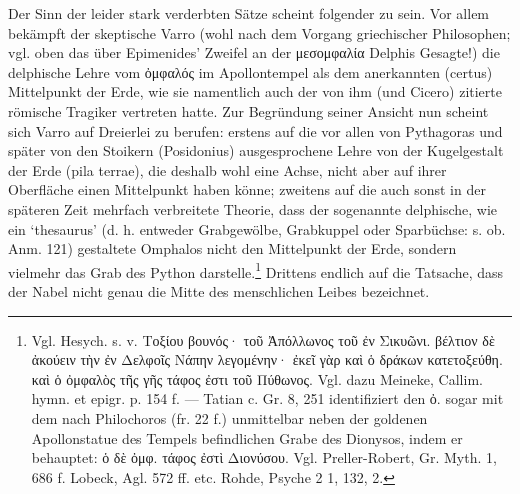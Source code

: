 \documentclass[a4paper, 11pt, oneside]{article}
\begin{document}
Der Sinn der leider stark verderbten Sätze scheint folgender zu sein. Vor allem bekämpft der skeptische Varro (wohl nach dem Vorgang griechischer Philosophen; vgl. oben das über Epimenides' Zweifel an der μεσομφαλία Delphis Gesagte!) die delphische Lehre vom ὀμφαλός im Apollontempel als dem anerkannten (certus) Mittelpunkt der Erde, wie sie namentlich auch der von ihm (und Cicero) zitierte römische Tragiker vertreten hatte. Zur Begründung seiner Ansicht nun scheint sich Varro auf Dreierlei zu berufen: erstens auf die vor allen von Pythagoras und später von den Stoikern (Posidonius) ausgesprochene Lehre von der Kugelgestalt der Erde (pila terrae), die deshalb wohl eine Achse, nicht aber auf ihrer Oberfläche einen Mittelpunkt haben könne; zweitens auf die auch sonst in der späteren Zeit mehrfach verbreitete Theorie, dass der sogenannte delphische, wie ein `thesaurus' (d. h. entweder Grabgewölbe, Grabkuppel oder Sparbüchse: s. ob. Anm. 121) gestaltete Omphalos nicht den Mittelpunkt der Erde, sondern vielmehr das Grab des Python darstelle.\footnote{Vgl. Hesych. s. v. Τοξίου βουνός· τοῦ Ἀπόλλωνος τοῦ ἐν Σικυῶνι. βέλτιον δὲ ἀκούειν τὴν ἐν Δελφοῖς Νάπην λεγομένην· ἐκεῖ γὰρ καὶ ὁ δράκων κατετοξεύθη. καὶ ὁ ὀμφαλὸς τῆς γῆς τάφος ἐστι τοῦ Πύθωνος. Vgl. dazu Meineke, Callim. hymn. et epigr. p. 154 f. --- Tatian c. Gr. 8, 251 identifiziert den ὀ. sogar mit dem nach Philochoros (fr. 22 f.) unmittelbar neben der goldenen Apollonstatue des Tempels befindlichen Grabe des Dionysos, indem er behauptet: ὁ δὲ ὀμφ. τάφος ἐστὶ Διονύσου. Vgl. Preller-Robert, Gr. Myth. 1, 686 f. Lobeck, Agl. 572 ff. etc. Rohde, Psyche 2 1, 132, 2.} Drittens endlich auf die Tatsache, dass der Nabel nicht genau die Mitte des menschlichen Leibes bezeichnet.
\end{document}

